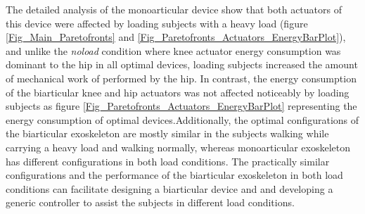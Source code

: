 \documentclass[10pt,letterpaper]{article}
\begin{document}
The detailed analysis of the monoarticular device show that both actuators of this device were affected by loading subjects with a heavy load (figure \ref{Fig_Main_Paretofronts} and \ref{Fig_Paretofronts_Actuators_EnergyBarPlot}), and unlike the \textit{noload} condition where knee actuator energy consumption was dominant to the hip in all optimal devices, loading subjects increased the amount of mechanical work of performed by the hip. In contrast, the energy consumption of the biarticular knee and hip actuators was not affected noticeably by loading subjects as figure \ref{Fig_Paretofronts_Actuators_EnergyBarPlot} representing the energy consumption of optimal devices.Additionally, the optimal configurations of the biarticular exoskeleton are mostly similar in the subjects walking while carrying a heavy load and walking normally, whereas monoarticular exoskeleton has different configurations in both load conditions. The practically similar configurations and the performance of the biarticular exoskeleton in both load conditions can facilitate designing a biarticular device and and developing a generic controller to assist the subjects in different  load conditions.\\
\end{document}

